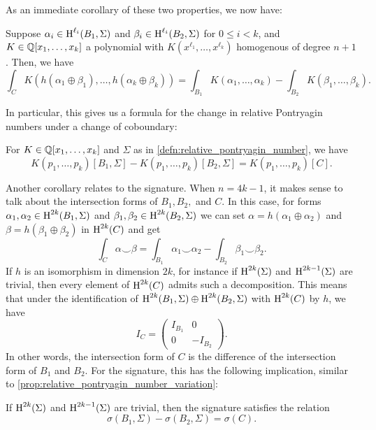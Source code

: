 As an immediate corollary of these two properties, we now have:
\begin{corollary}
	Suppose $\alpha_i\in \operatorname{H}^{\ell_i}(B_1, \Sigma)$ and $\beta_i\in \operatorname{H}^{\ell_i}(B_2,\Sigma)$ for $0\leq i < k$, and $K\in \mathbb{Q}[x_1,\ldots,x_k]$ a polynomial with $K(x^{\ell_1}, \ldots, x^{\ell_k})$ homogenous of degree $n+1$. Then, we have
	\[
		\int_C K(h(\alpha_1\oplus \beta_1),\ldots, h(\alpha_k\oplus \beta_k))
		=
		\int_{B_1} K(\alpha_1,\ldots, \alpha_k) - \int_{B_2} K(\beta_1,\ldots, \beta_k).
	\]
\end{corollary}

In particular, this gives us a formula for the change in relative Pontryagin numbers under a change of coboundary:
\begin{proposition}\label{prop:relative_pontryagin_number_variation}
	For $K\in \mathbb{Q}[x_1,\ldots, x_k]$ and $\Sigma$ as in \cref{defn:relative_pontryagin_number}, we have
	\begin{equation}\label{eq:relative_pontryagin_number_variation}
		K(p_1,\ldots,p_k)[B_1,\Sigma] - K(p_1,\ldots, p_k)[B_2,\Sigma] = K(p_1,\ldots,p_k)[C].
	\end{equation}
\end{proposition}

Another corollary relates to the signature. When $n=4k-1$, it makes sense to talk about the intersection forms of $B_1,B_2,$ and $C$. In this case, for forms $\alpha_1,\alpha_2\in \operatorname{H}^{2k}(B_1, \Sigma)$ and $\beta_1,\beta_2\in \operatorname{H}^{2k}(B_2,\Sigma)$ we can set $\alpha=h(\alpha_1\oplus\alpha_2)$ and $\beta=h(\beta_1\oplus \beta_2)$ in $\operatorname{H}^{2k}(C)$ and get
\[
	\int_{C} \alpha\smile \beta = \int_{B_1} \alpha_1\smile \alpha_2 - \int_{B_2}\beta_1\smile \beta_2.
\]
If $h$ is an isomorphism in dimension $2k$, for instance if $\operatorname{H}^{2k}(\Sigma)$ and $\operatorname{H}^{2k-1}(\Sigma)$ are trivial, then every element of $\operatorname{H}^{2k}(C)$ admits such a decomposition. This means that under the identification of $\operatorname{H}^{2k}(B_1,\Sigma)\oplus \operatorname{H}^{2k}(B_2,\Sigma)$ with $\operatorname{H}^{2k}(C)$ by $h$, we have
\[
	I_C = \begin{pmatrix}I_{B_1} & 0 \\ 0 & -I_{B_2}\end{pmatrix}.
\]
In other words, the intersection form of $C$ is the difference of the intersection form of $B_1$ and $B_2$. For the signature, this has the following implication, similar to \cref{prop:relative_pontryagin_number_variation}:
\begin{proposition}\label{prop:signature_variation}
	If $\operatorname{H}^{2k}(\Sigma)$ and $\operatorname{H}^{2k-1}(\Sigma)$ are trivial, then the signature satisfies the relation
	\begin{equation}\label{eq:signature_variation}
		\sigma(B_1, \Sigma) - \sigma(B_2, \Sigma) = \sigma(C).
	\end{equation}
\end{proposition}

